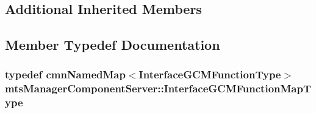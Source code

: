 \subsection*{Additional Inherited Members}


\subsection{Member Typedef Documentation}
\hypertarget{classmts_manager_component_server_a9b456473c566d9993274d3de0f124f7c}{
\subsubsection[{Interface\-G\-C\-M\-Function\-Map\-Type}]{\setlength{\rightskip}{0pt plus 5cm}typedef {\bf cmn\-Named\-Map}$<${\bf Interface\-G\-C\-M\-Function\-Type}$>$ {\bf mts\-Manager\-Component\-Server\-::\-Interface\-G\-C\-M\-Function\-Map\-Type}\hspace{0.3cm}{\ttfamily [protected]}}}\label{classmts_manager_component_server_a9b456473c566d9993274d3de0f124f7c}


